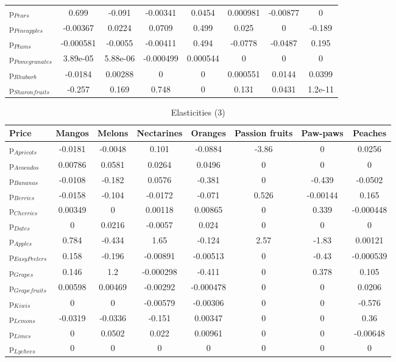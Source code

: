 \documentclass[11pt]{article}
\begin{document}
\begin{table}[h]
\begin{center}
\begin{tabular}{lccccccc}
p$_{Pears}$ &0.699 &-0.091 &-0.00341 &0.0454 &0.000981 &-0.00877 &0 \\
p$_{Pineapples}$ &-0.00367 &0.0224 &0.0709 &0.499 &0.025 &0 &-0.189 \\
p$_{Plums}$ &-0.000581 &-0.0055 &-0.00411 &0.494 &-0.0778 &-0.0487 &0.195 \\
p$_{Pomegranates}$ &3.89e-05 &5.88e-06 &-0.000499 &0.000544 &0 &0 &0 \\
p$_{Rhubarb}$ &-0.0184 &0.00288 &0 &0 &0.000551 &0.0144 &0.0399 \\
p$_{Sharon fruits}$ &-0.257 &0.169 &0.748 &0 &0.131 &0.0431 &1.2e-11 \\
\end{tabular}
\end{center}
\end{table}
\begin{table}[h]
\caption{Elasticities (3)}
\label{table:elasticities 3}
\begin{center}
\begin{tabular}{lccccccc} \hline \hline
Price &Mangos &Melons &Nectarines &Oranges &Passion fruits &Paw-paws &Peaches \\ \hline
p$_{Apricots}$ &-0.0181 &-0.0048 &0.101 &-0.0884 &-3.86 &0 &0.0256 \\
p$_{Avocados}$ &0.00786 &0.0581 &0.0264 &0.0496 &0 &0 &0 \\
p$_{Bananas}$ &-0.0108 &-0.182 &0.0576 &-0.381 &0 &-0.439 &-0.0502 \\
p$_{Berries}$ &-0.0158 &-0.104 &-0.0172 &-0.071 &0.526 &-0.00144 &0.165 \\
p$_{Cherries}$ &0.00349 &0 &0.00118 &0.00865 &0 &0.339 &-0.000448 \\
p$_{Dates}$ &0 &0.0216 &-0.0057 &0.024 &0 &0 &0 \\
p$_{Apples}$ &0.784 &-0.434 &1.65 &-0.124 &2.57 &-1.83 &0.00121 \\
p$_{Easy Peelers}$ &0.158 &-0.196 &-0.00891 &-0.00513 &0 &-0.43 &-0.000539 \\
p$_{Grapes}$ &0.146 &1.2 &-0.000298 &-0.411 &0 &0.378 &0.105 \\
p$_{Grapefruits}$ &0.00598 &0.00469 &-0.00292 &-0.000478 &0 &0 &0.0206 \\
p$_{Kiwis}$ &0 &0 &-0.00579 &-0.00306 &0 &0 &-0.576 \\
p$_{Lemons}$ &-0.0319 &-0.0336 &-0.151 &0.00347 &0 &0 &0.36 \\
p$_{Limes}$ &0 &0.0502 &0.022 &0.00961 &0 &0 &-0.00648 \\
p$_{Lychees}$ &0 &0 &0 &0 &0 &0 &0 \\

\end{tabular}
\end{center}
\end{table}
\end{document}
